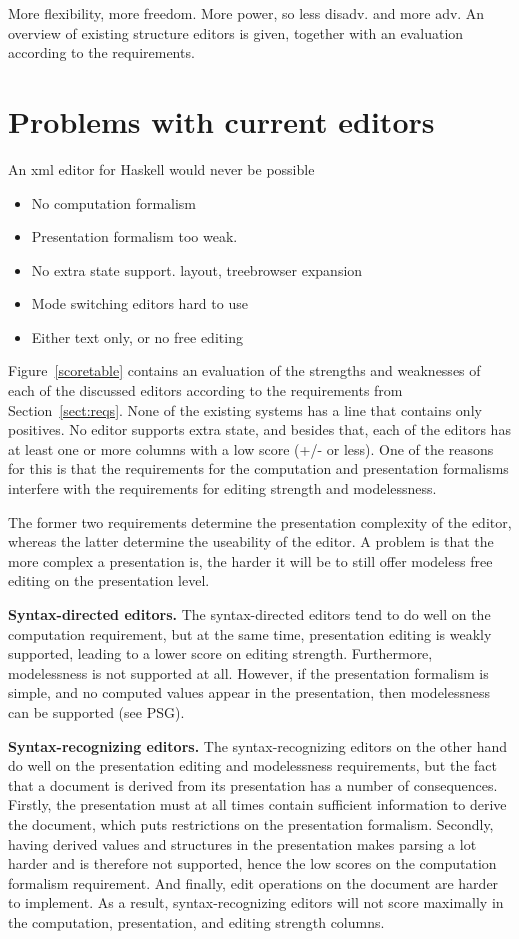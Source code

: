  
\bc
More flexibility, more freedom. More power, so less disadv. and more adv. An overview of existing structure editors is given, together with an evaluation according to the requirements. 

\section{Problems with current editors}
An xml editor for Haskell would never be possible
\begin{itemize}
\item No computation formalism
\item Presentation formalism too weak. 
\item No extra state support. layout, treebrowser expansion
\item Mode switching editors hard to use
\item Either text only, or no free editing
\end{itemize}
\ec


Figure~\ref{scoretable} contains an evaluation of the strengths and weaknesses of each of the discussed editors according to the requirements from Section~\ref{sect:reqs}. None of the existing systems has a line that contains only positives. No editor supports extra state, and besides that, each of the editors has at least one or more columns with a low score (+/- or less). One of the reasons for this is that the requirements for the computation and presentation formalisms interfere with the requirements for editing strength and modelessness.

The former two requirements determine the presentation complexity of the editor, whereas the latter determine the useability of the editor. A problem is that the more complex a presentation is, the harder it will be to still offer modeless free editing on the presentation level.

{\bf Syntax-directed editors.} The syntax-directed editors tend to do well on the computation requirement, but at the same time, presentation editing is weakly supported, leading to a lower score on editing strength. Furthermore, modelessness is not supported at all. However, if the presentation formalism is simple, and no computed values appear in the presentation, then modelessness can be supported (see PSG). 

{\bf Syntax-recognizing editors.} The syntax-recognizing editors on the other hand do well on the presentation editing and modelessness requirements, but the fact that a document is derived from its presentation has a number of consequences. Firstly, the presentation must at all times contain sufficient information to derive the document, which puts restrictions on the presentation formalism. Secondly, having derived values and structures in the presentation makes parsing a lot harder and is therefore not supported, hence the low scores on the computation formalism requirement. And finally, edit operations on the document are harder to implement. As a result, syntax-recognizing editors will not score maximally in the computation, presentation, and editing strength columns.

